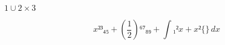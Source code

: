 \documentclass{article}
\begin{document}
$1 ∪ 2 × 3$

\[ x²³₄₅ + \left( \frac{1}{2} \right) ⁶⁷₈₉ + \int ₁² x + x² \lbrace \rbrace \, dx\]
\end{document}
